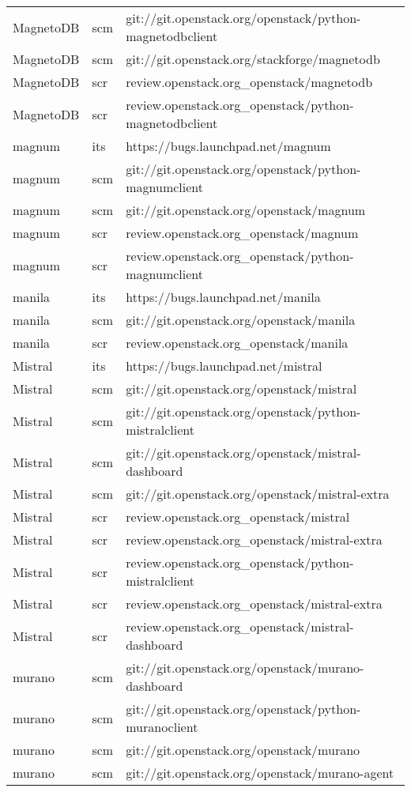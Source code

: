 \begin{center}
\begin{longtable}{|p{4cm}|p{1cm}|p{10cm}|}
MagnetoDB&scm&git://git.openstack.org/openstack/python-magnetodbclient\\ 
MagnetoDB&scm&git://git.openstack.org/stackforge/magnetodb\\ 
MagnetoDB&scr&review.openstack.org\_openstack/magnetodb\\ 
MagnetoDB&scr&review.openstack.org\_openstack/python-magnetodbclient\\ 
magnum&its&https://bugs.launchpad.net/magnum\\ 
magnum&scm&git://git.openstack.org/openstack/python-magnumclient\\ 
magnum&scm&git://git.openstack.org/openstack/magnum\\ 
magnum&scr&review.openstack.org\_openstack/magnum\\ 
magnum&scr&review.openstack.org\_openstack/python-magnumclient\\ 
manila&its&https://bugs.launchpad.net/manila\\ 
manila&scm&git://git.openstack.org/openstack/manila\\ 
manila&scr&review.openstack.org\_openstack/manila\\ 
Mistral&its&https://bugs.launchpad.net/mistral\\ 
Mistral&scm&git://git.openstack.org/openstack/mistral\\ 
Mistral&scm&git://git.openstack.org/openstack/python-mistralclient\\ 
Mistral&scm&git://git.openstack.org/openstack/mistral-dashboard\\ 
Mistral&scm&git://git.openstack.org/openstack/mistral-extra\\ 
Mistral&scr&review.openstack.org\_openstack/mistral\\ 
Mistral&scr&review.openstack.org\_openstack/mistral-extra\\ 
Mistral&scr&review.openstack.org\_openstack/python-mistralclient\\ 
Mistral&scr&review.openstack.org\_openstack/mistral-extra\\ 
Mistral&scr&review.openstack.org\_openstack/mistral-dashboard\\ 
murano&scm&git://git.openstack.org/openstack/murano-dashboard\\ 
murano&scm&git://git.openstack.org/openstack/python-muranoclient\\ 
murano&scm&git://git.openstack.org/openstack/murano\\ 
murano&scm&git://git.openstack.org/openstack/murano-agent\\ 

\end{longtable}
\end{center}
